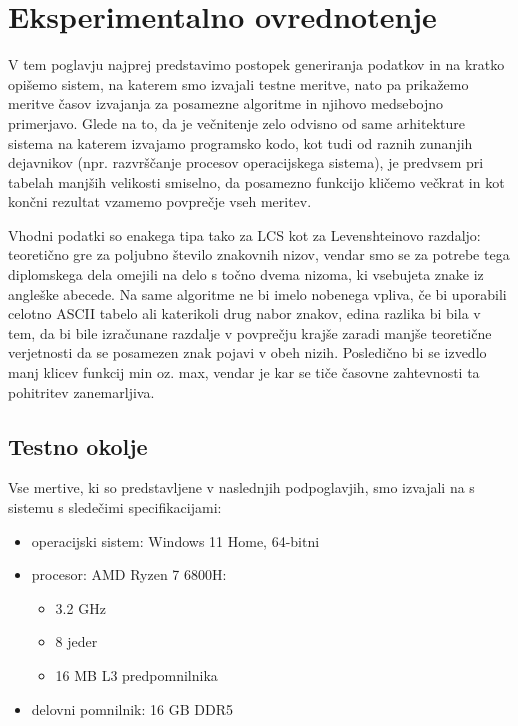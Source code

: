 \documentclass[a4paper,12pt,openright]{book}
\begin{document}
\chapter{Eksperimentalno ovrednotenje}

V tem poglavju najprej predstavimo postopek generiranja podatkov in na kratko opišemo sistem, na katerem smo izvajali testne meritve, nato pa prikažemo meritve časov izvajanja za posamezne algoritme in njihovo medsebojno primerjavo. Glede na to, da je večnitenje zelo odvisno od same arhitekture sistema na katerem izvajamo programsko kodo, kot tudi od raznih zunanjih dejavnikov (npr. razvrščanje procesov operacijskega sistema), je predvsem pri tabelah manjših velikosti smiselno, da posamezno funkcijo kličemo večkrat in kot končni rezultat vzamemo povprečje vseh meritev. 

Vhodni podatki so enakega tipa tako za LCS kot za Levenshteinovo razdaljo: teoretično gre za poljubno število znakovnih nizov, vendar smo se za potrebe tega diplomskega dela omejili na delo s točno dvema nizoma, ki vsebujeta znake iz angleške abecede. Na same algoritme ne bi imelo nobenega vpliva, če bi uporabili celotno ASCII tabelo ali katerikoli drug nabor znakov, edina razlika bi bila v tem, da bi bile izračunane razdalje v povprečju krajše zaradi manjše teoretične verjetnosti da se posamezen znak pojavi v obeh nizih. Posledično bi se izvedlo manj klicev funkcij min oz. max, vendar je kar se tiče časovne zahtevnosti ta pohitritev zanemarljiva. 

\section{Testno okolje}

Vse mertive, ki so predstavljene v naslednjih podpoglavjih, smo izvajali na s sistemu s sledečimi specifikacijami:
\begin{itemize}
    \item operacijski sistem: Windows 11 Home, 64-bitni
    \item procesor: AMD Ryzen 7 6800H:
        \begin{itemize}
            \item 3.2 GHz
            \item 8 jeder
            \item 16 MB L3 predpomnilnika
        \end{itemize}
    \item delovni pomnilnik: 16 GB DDR5
\end{itemize}
\end{document}
